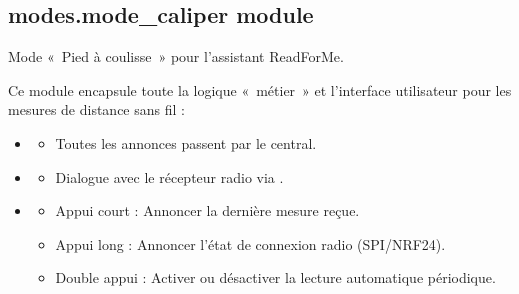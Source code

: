 \documentclass[letterpaper,10pt,french]{sphinxmanual}
\begin{document}
\subsection{modes.mode\_caliper module}
\label{\detokenize{api/modes:module-modes.mode_caliper}}\label{\detokenize{api/modes:modes-mode-caliper-module}}
\sphinxAtStartPar
Mode « Pied à coulisse » pour l’assistant ReadForMe.

\sphinxAtStartPar
Ce module encapsule toute la logique « métier » et l’interface utilisateur pour
les mesures de distance sans fil :
\begin{itemize}
\item {} \begin{description}
\begin{itemize}
\item {} 
\sphinxAtStartPar
Toutes les annonces passent par le  central.

\end{itemize}

\end{description}

\item {} \begin{description}
\begin{itemize}
\item {} 
\sphinxAtStartPar
Dialogue avec le récepteur radio via .

\end{itemize}

\end{description}

\item {} \begin{description}
\begin{itemize}
\item {} 
\sphinxAtStartPar
Appui court   : Annoncer la dernière mesure reçue.

\item {} 
\sphinxAtStartPar
Appui long    : Annoncer l’état de connexion radio (SPI/NRF24).

\item {} 
\sphinxAtStartPar
Double appui  : Activer ou désactiver la lecture automatique périodique.

\end{itemize}

\end{description}

\end{itemize}
\end{document}
